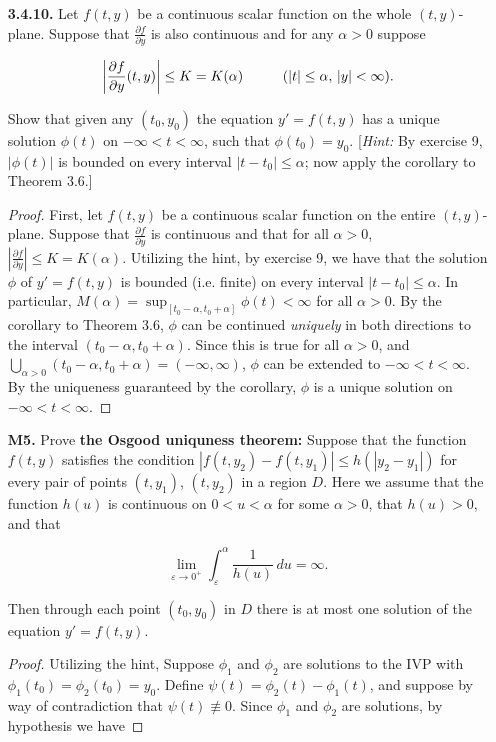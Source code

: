 \documentclass[11pt,oneside,english]{amsart}
\theoremstyle{definition}
\newcommand{\pspace}{\hspace{10mm}}
\newcommand{\lom}[2]{\lim_{{#1}\rightarrow{#2}}}
\newcommand{\pp}[2]{\frac{\partial{#1}}{\partial{#2}}}
\newcommand{\ve}{\varepsilon}
\begin{document}
\begin{enumerate}
\pagebreak

\item[\textbf{3.4.10.}] Let $f(t,y)$ be a continuous scalar function on the whole $(t,y)$-plane. Suppose that $\pp{f}{y}$ is also continuous and for any $\alpha>0$ suppose

\[
\left|\pp{f}{y}(t,y)\right|\leq K=K(\alpha)\pspace(|t|\leq\alpha,\,|y|<\infty).
\]

Show that given any $(t_0,y_0)$ the equation $y'=f(t,y)$ has a unique solution $\phi(t)$ on $-\infty<t<\infty$, such that $\phi(t_0)=y_0$. [\textit{Hint:} By exercise 9, $|\phi(t)|$ is bounded on every interval $|t-t_0|\leq\alpha$; now apply the corollary to Theorem 3.6.]

\begin{proof}
First, let $f(t,y)$ be a continuous scalar function on the entire $(t,y)$-plane. Suppose that $\pp{f}{y}$ is continuous and that for all $\alpha>0$, $\left|\pp{f}{y}\right|\leq K=K(\alpha)$. Utilizing the hint, by exercise 9, we have that the solution $\phi$ of $y'=f(t,y)$ is bounded (i.e. finite) on every interval $|t-t_0|\leq\alpha$. In particular, $M(\alpha)=\sup_{[t_0-\alpha,t_0+\alpha]}\phi(t)<\infty$ for all $\alpha>0$. By the corollary to Theorem 3.6, $\phi$ can be continued \textit{uniquely} in both directions to the interval $(t_0-\alpha,t_0+\alpha)$. Since this is true for all $\alpha>0$, and $\bigcup_{\alpha>0}(t_0-\alpha,t_0+\alpha)=(-\infty,\infty)$, $\phi$  can be extended to $-\infty<t<\infty$. By the uniqueness guaranteed by the corollary, $\phi$ is a unique solution on $-\infty<t<\infty$.
\end{proof}

\pagebreak





\item[\textbf{M5.}] Prove \textbf{the Osgood uniquness theorem:} Suppose that the function $f(t,y)$ satisfies the condition $|f(t,y_2)-f(t,y_1)|\leq h(|y_2-y_1|)$ for every pair of points $(t,y_1)$, $(t,y_2)$ in a region $D$. Here we assume that the function $h(u)$ is continuous on $0<u<\alpha$ for some $\alpha>0$, that $h(u)>0$, and that

\[
\lom{\ve}{0^+}\int_{\ve}^\alpha \frac{1}{h(u)}\,du=\infty.
\]

Then through each point $(t_0,y_0)$ in $D$ there is at most one solution of the equation $y'=f(t,y)$.

\begin{proof}
Utilizing the hint, Suppose $\phi_1$ and $\phi_2$ are solutions to the IVP with $\phi_1(t_0)=\phi_2(t_0)=y_0$. Define $\psi(t)=\phi_2(t)-\phi_1(t)$, and suppose by way of contradiction that $\psi(t)\not\equiv0$. Since $\phi_1$ and $\phi_2$ are solutions, by hypothesis we have


\end{proof}
\end{enumerate}
\end{document}

